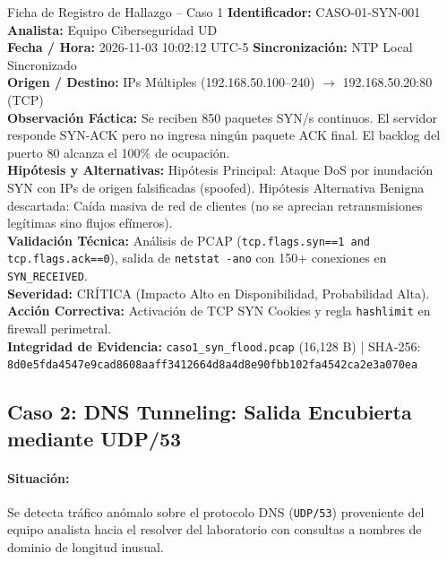\documentclass[11pt,letterpaper]{article}
\begin{document}
\begin{hallazgobox}{Ficha de Registro de Hallazgo -- Caso 1}
    \textbf{Identificador:} CASO-01-SYN-001 \hfill \textbf{Analista:} Equipo Ciberseguridad UD\\
    \textbf{Fecha / Hora:} 2026-11-03 10:02:12 UTC-5 \hfill \textbf{Sincronización:} NTP Local Sincronizado\\
    \textbf{Origen / Destino:} IPs Múltiples (192.168.50.100--240) $\rightarrow$ 192.168.50.20:80 (TCP)\\
    \textbf{Observación Fáctica:} Se reciben 850 paquetes SYN/s continuos. El servidor responde SYN-ACK pero no ingresa ningún paquete ACK final. El backlog del puerto 80 alcanza el 100\% de ocupación.\\
    \textbf{Hipótesis y Alternativas:} Hipótesis Principal: Ataque DoS por inundación SYN con IPs de origen falsificadas (spoofed). Hipótesis Alternativa Benigna descartada: Caída masiva de red de clientes (no se aprecian retransmisiones legítimas sino flujos efímeros).\\
    \textbf{Validación Técnica:} Análisis de PCAP (\texttt{tcp.flags.syn==1 and tcp.flags.ack==0}), salida de \texttt{netstat -ano} con 150+ conexiones en \texttt{SYN\_RECEIVED}.\\
    \textbf{Severidad:} CRÍTICA (Impacto Alto en Disponibilidad, Probabilidad Alta).\\
    \textbf{Acción Correctiva:} Activación de TCP SYN Cookies y regla \texttt{hashlimit} en firewall perimetral.\\
    \textbf{Integridad de Evidencia:} \texttt{caso1\_syn\_flood.pcap} (16,128 B) | SHA-256: \texttt{8d0e5fda4547e9cad8608aaff3412664d8a4d8e90fbb102fa4542ca2e3a070ea}
\end{hallazgobox}

\newpage
\subsection{Caso 2: DNS Tunneling: Salida Encubierta mediante UDP/53}

\paragraph{Situación:} Se detecta tráfico anómalo sobre el protocolo DNS (\texttt{UDP/53}) proveniente del equipo analista hacia el resolver del laboratorio con consultas a nombres de dominio de longitud inusual.
\end{document}
